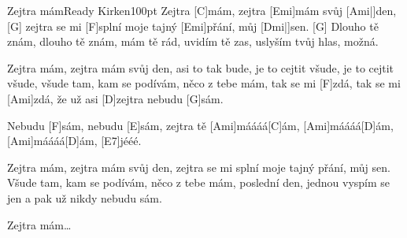 \begin{song}{Zejtra mám}{Ready Kirken}{100pt}
%
Zejtra [C]mám, zejtra [Emi]mám svůj [Ami|]{den,} [G]{}
zejtra se mi [F]splní moje tajný [Emi]přání, můj [Dmi|]{sen.} [G]{}
Dlouho tě znám, dlouho tě znám, mám tě rád,
uvidím tě zas, uslyším tvůj hlas, možná.

%
Zejtra mám, zejtra mám svůj den,
asi to tak bude, je to cejtit všude, je to cejtit všude,
všude tam, kam se podívám, něco z tebe mám,
tak se mi [F]zdá, tak se mi [Ami]zdá,
že už asi [D]zejtra nebudu [G]sám.

\chorus%
Nebudu [F]sám, nebudu [E]sám, zejtra tě [Ami]máááá[C]{á}m,
[Ami]máááá[D]{á}m, [Ami]máááá[D]{á}m, [E7]jééé.

%
Zejtra mám, zejtra mám svůj den,
zejtra se mi splní moje tajný přání, můj sen.
Všude tam, kam se podívám, něco z tebe mám,
poslední den, jednou vyspím se jen
a pak už nikdy nebudu sám.

\chorus \rl Zejtra mám\dots{}
\end{song}
